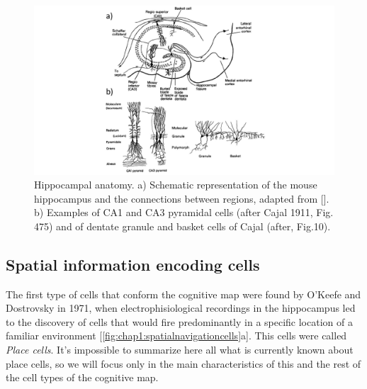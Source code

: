 \begin{figure}
    \centering
    \includegraphics[trim={200 0 200 0},clip,width=\textwidth]{Figures/Chapter1/intro_fig_hipp_anat.pdf}
    \caption{Hippocampal anatomy. a) Schematic representation of the mouse hippocampus and the connections between regions, adapted from [\cite{okeefebook}]. b) Examples of CA1 and CA3 pyramidal cells (after Cajal 1911, Fig. 475) and of dentate granule and basket cells of Cajal (after\cite{lorente1934}, Fig.10).}
    \label{fig:chap1:hippocampal_anat}
\end{figure}

\subsection{Spatial information encoding cells}
\label{chap1:sec:1:subsec2:spat_info_cells}
The first type of cells that conform the cognitive map were found by O’Keefe and Dostrovsky in 1971, when electrophisiological recordings in the hippocampus led to the discovery of cells that would fire predominantly in a specific location of a familiar environment [\ref{fig:chap1:spatialnavigationcells}a].
This cells were called \textit{Place cells}. 
It's impossible to summarize here all what is currently known about place cells, so we will focus only in the main characteristics of this and the rest of the cell types of the cognitive map.

